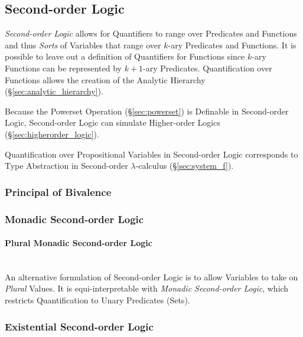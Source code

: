 \subsection{Second-order Logic}\label{sec:secondorder_logic}

\emph{Second-order Logic} allows for Quantifiers to range over
Predicates and Functions and thus \emph{Sorts} of Variables that range
over $k$-ary Predicates and Functions. It is possible to leave out a
definition of Quantifiers for Functions since $k$-ary Functions can be
represented by $k+1$-ary Predicates.\cite{shapiro00} Quantification
over Functions allows the creation of the Analytic Hierarchy
(\S\ref{sec:analytic_hierarchy}).

Because the Powerset Operation (\S\ref{sec:powerset}) is Definable in
Second-order Logic, Second-order Logic can simulate Higher-order
Logics (\S\ref{sec:higherorder_logic}).

Quantification over Propositional Variables in Second-order Logic
corresponds to Type Abstraction in Second-order $\lambda$-calculus
(\S\ref{sec:system_f}).



\subsubsection{Principal of Bivalence}\label{sec:bivalence_principal}

\subsubsection{Monadic Second-order Logic}\label{sec:monadic_secondorder}

\paragraph{Plural Monadic Second-order Logic}
\label{sec:plural_monadic_secondorder}\hfill \\

An alternative formulation of Second-order Logic is to allow Variables
to take on \emph{Plural} Values. It is equi-interpretable with
\emph{Monadic Second-order Logic}, which restricts Quantification to
Unary Predicates (Sets).



\subsubsection{Existential Second-order Logic}
\label{sec:existential_secondorder}


